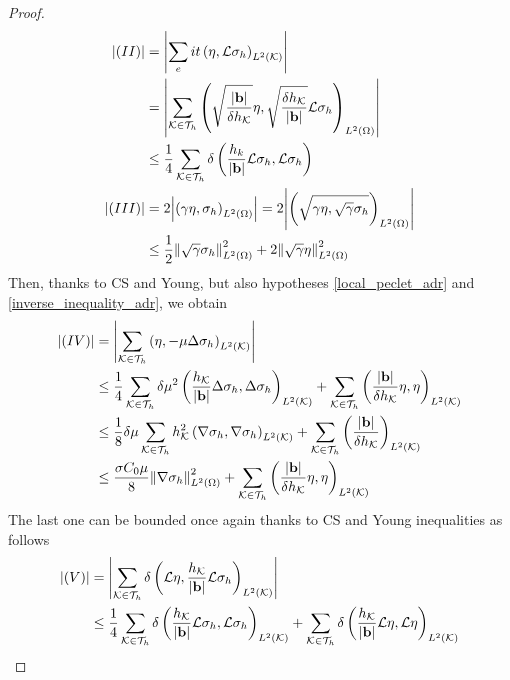 \begin{proof}
{\begin{align*}
        \abs{(II)} &= \abs{\sum_eit \left( \eta, \mathcal{L}\sigma_h \right)_{L^2(\mathcal{K})}} \\
        & = \abs{\sum_{\mathcal{K}\in\mathcal{T}_h} \left( \sqrt{\frac{\abs{\textbf{b}}}{\delta h_{\mathcal{K}}}} \eta, \sqrt{\frac{\delta h_{\mathcal{K}}}{\abs{\textbf{b}}}} \mathcal{L}\sigma_h \right)_{L^2(\Omega)}} \\
        &\leq \frac{1}{4} \sum_{\mathcal{K}\in\mathcal{T}_h} \delta \left( \frac{h_k}{\abs{\textbf{b}}} \mathcal{L}\sigma_h, \mathcal{L}\sigma_h \right) \\
        \abs{(III)} &= 2\abs{\left( \gamma \eta, \sigma_h \right)_{L^2(\Omega)}} = 2\abs{\left( \sqrt{\gamma \eta, \sqrt{\gamma}\sigma_h} \right)_{L^2(\Omega)}} \\
        &\leq \frac{1}{2} \norm{\sqrt{\gamma}\sigma_h}_{L^2(\Omega)}^2 + 2 \norm{\sqrt{\gamma} \eta}_{L^2(\Omega)}^2
    \end{align*}
    }
    Then, thanks to CS and Young, but also hypotheses \eqref{local_peclet_adr} and \eqref{inverse_inequality_adr}, we obtain 
    \begin{align*}
        \abs{(IV)} &= \abs{\sum_{\mathcal{K}\in\mathcal{T}_h} \left( \eta, -\mu \Delta \sigma_h \right)_{L^2(\mathcal{K})}} \\
        &\leq \frac{1}{4} \sum_{\mathcal{K}\in\mathcal{T}_h} \delta \mu^2 \left( \frac{h_{\mathcal{K}}}{\abs{\textbf{b}}}\Delta \sigma_h, \Delta \sigma_h \right)_{L^2(\mathcal{K})} + \sum_{\mathcal{K}\in\mathcal{T}_h} \left( \frac{\abs{\textbf{b}}}{\delta h_{\mathcal{K}}} \eta, \eta \right)_{L^2(\mathcal{K})} \\
        &\leq \frac{1}{8} \delta \mu \sum_{\mathcal{K}\in\mathcal{T}_h} h^2_{\mathcal{K}} \left( \nabla \sigma_h, \nabla \sigma_h \right)_{L^2(\mathcal{K})} + \sum_{\mathcal{K}\in\mathcal{T}_h} \left( \frac{\abs{\textbf{b}}}{\delta h_{\mathcal{K}}} \right)_{L^2(\mathcal{K})} \\
        &\leq \frac{\sigma C_0 \mu}{8} \norm{\nabla \sigma_h}_{L^2(\Omega)}^2 + \sum_{\mathcal{K}\in\mathcal{T}_h} \left( \frac{\abs{\textbf{b}}}{\delta h_{\mathcal{K}}}\eta, \eta \right)_{L^2(\mathcal{K})}
    \end{align*}
    The last one can be bounded once again thanks to CS and Young inequalities as follows 
    \begin{align*}
        \abs{(V)} &= \abs{\sum_{\mathcal{K}\in\mathcal{T}_h} \delta \left( \mathcal{L}\eta, \frac{h_{\mathcal{K}}}{\abs{\textbf{b}}}\mathcal{L}\sigma_h \right)_{L^2(\mathcal{K})}} \\
        &\leq \frac{1}{4} \sum_{\mathcal{K}\in\mathcal{T}_h} \delta \left( \frac{h_{\mathcal{K}}}{\abs{\textbf{b}}} \mathcal{L}\sigma_h, \mathcal{L}\sigma_h \right)_{L^2(\mathcal{K})} + \sum_{\mathcal{K}\in\mathcal{T}_h} \delta\left( \frac{h_{\mathcal{K}}}{\abs{\textbf{b}}} \mathcal{L}\eta, \mathcal{L}\eta \right)_{L^2(\mathcal{K})} 
    \end{align*}

\end{proof}
